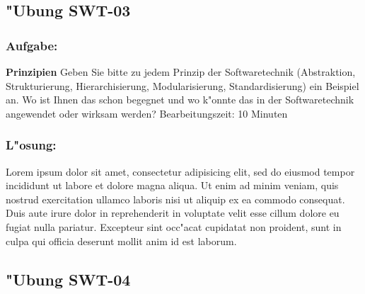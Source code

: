 





\newpage
\subsection{"Ubung SWT-03}
\subsubsection*{Aufgabe:}

\begin{framed}
\textbf{Prinzipien}
\smallbreak
Geben Sie bitte zu jedem Prinzip der Softwaretechnik (Abstraktion, Strukturierung, Hierarchisierung, Modularisierung, Standardisierung) ein Beispiel an. Wo ist Ihnen das schon begegnet und wo k"onnte das in der Softwaretechnik angewendet oder wirksam werden?
\bigbreak
\small Bearbeitungszeit: 10 Minuten
\end{framed}
\bigbreak
\bigbreak
\subsubsection*{L"osung:}
Lorem ipsum dolor sit amet, consectetur adipisicing elit, sed do eiusmod tempor incididunt ut labore et dolore magna aliqua. Ut enim ad minim veniam, quis nostrud exercitation ullamco laboris nisi ut aliquip ex ea commodo consequat. Duis aute irure dolor in reprehenderit in voluptate velit esse cillum dolore eu fugiat nulla pariatur. Excepteur sint occ"acat cupidatat non proident, sunt in culpa qui officia deserunt mollit anim id est laborum.

\newpage
\subsection{"Ubung SWT-04}
